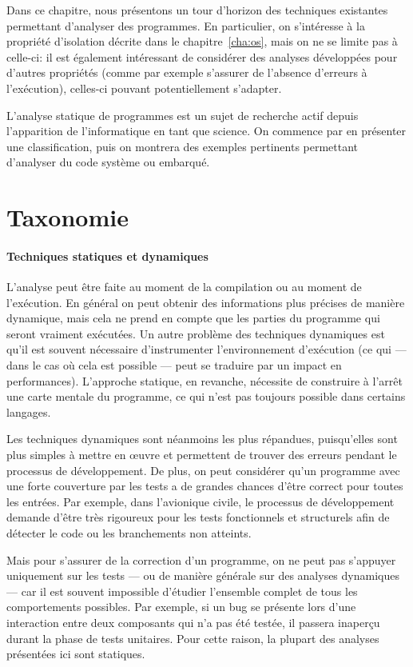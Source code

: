 
Dans ce chapitre, nous présentons un tour d'horizon des techniques existantes
permettant d'analyser des programmes. En particulier, on s'intéresse à la
propriété d'isolation décrite dans le chapitre~\ref{cha:os}, mais on ne se
limite pas à celle-ci: il est également intéressant de considérer des analyses
développées pour d'autres propriétés (comme par exemple s'assurer de l'absence
d'erreurs à l'exécution), celles-ci pouvant potentiellement s'adapter.

L'analyse statique de programmes est un sujet de recherche actif depuis
l'apparition de l'informatique en tant que science. On commence par en présenter
une classification, puis on montrera des exemples pertinents permettant
d'analyser du code système ou embarqué.

\section{Taxonomie}

\paragraph{Techniques statiques et dynamiques}

L'analyse peut être faite au moment de la compilation ou au moment de
l'exécution. En général on peut obtenir des informations plus précises de
manière dynamique, mais cela ne prend en compte que les parties du programme qui
seront vraiment exécutées. Un autre problème des techniques dynamiques est qu'il
est souvent nécessaire d'instrumenter l'environnement d'exécution (ce qui ---
dans le cas où cela est possible --- peut se traduire par un impact en
performances). L'approche statique, en revanche, nécessite de construire à
l'arrêt une carte mentale du programme, ce qui n'est pas toujours possible dans
certains langages.

Les techniques dynamiques sont néanmoins les plus répandues, puisqu'elles sont
plus simples à mettre en œuvre et permettent de trouver des erreurs pendant le
processus de développement. De plus, on peut considérer qu'un programme avec une
forte couverture par les tests a de grandes chances d'être correct pour toutes
les entrées. Par exemple, dans l'avionique civile, le processus de développement
demande d'être très rigoureux pour les tests fonctionnels et structurels afin de
détecter le code ou les branchements non atteints.

Mais pour s'assurer de la correction d'un programme, on ne peut pas s'appuyer
uniquement sur les tests --- ou de manière générale sur des analyses dynamiques
--- car il est souvent impossible d'étudier l'ensemble complet de tous les
comportements possibles. Par exemple, si un bug se présente lors d'une
interaction entre deux composants qui n'a pas été testée, il passera inaperçu
durant la phase de tests unitaires. Pour cette raison, la plupart des analyses
présentées ici sont statiques.

